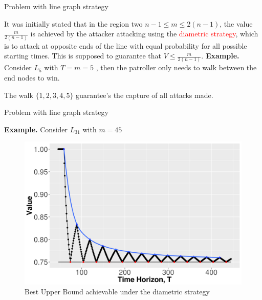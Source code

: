 \documentclass[11pt]{beamer}
\begin{document}
\hypertarget{Problem with line graph strategy}{}
\begin{frame}{Problem with line graph strategy}

It was initially stated that in the region two $n-1 \leq m \leq 2(n-1)$, the value $\frac{m}{2(n-1)}$ is achieved by the attacker attacking using the \textcolor{red}{diametric strategy}, which is to attack at opposite ends of the line with equal probability for all possible starting times. This is supposed to guarantee that $V \leq \frac{m}{2(n-1)}$.
\newline
\newline
\textbf{Example.}
Consider $L_{5}$ with $T=m=5$ , then the patroller only needs to walk between the end nodes to win.
\begin{center}
\end{center}
The walk $\{ 1,2,3,4,5 \}$ guarantee's the capture of all attacks made.

\end{frame}

\begin{frame}{Problem with line graph strategy}

\textbf{Example.}
Consider $L_{31}$ with $m=45$

\begin{figure}
\includegraphics[scale=0.4]{DiametricAttack(m_45,d_30)1.png}
\caption{Best Upper Bound achievable under the diametric strategy}
\end{figure}

\end{frame}
\end{document}
